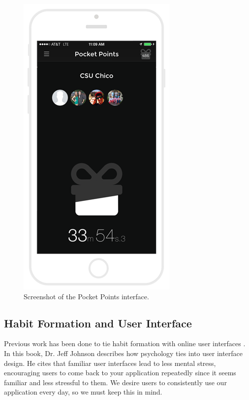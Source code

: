 \begin{figure}
	\centering
	\includegraphics[width=0.7\linewidth]{figures/pocket-points}
	\caption[Memrise]{Screenshot of the Pocket Points interface. }
	\label{fig:pocket-points}
\end{figure}


\subsection{Habit Formation and User Interface}
Previous work has been done to tie habit formation with online user interfaces \cite{johnson2013designing}. In this book, Dr. Jeff Johnson describes how psychology ties into user interface design. He cites that familiar user interfaces lead to less mental stress, encouraging users to come back to your application repeatedly since it seems familiar and less stressful to them. We desire users to consistently use our application every day, so we must keep this in mind. 

